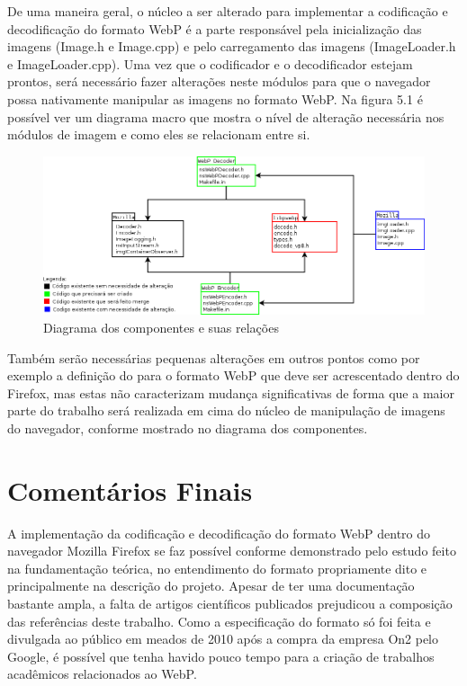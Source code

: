 \documentclass[espaco=simples,appendix=Name]{abnt}
\begin{document}
De uma maneira geral, o núcleo a ser alterado para implementar a codificação e decodificação do formato WebP é a parte responsável pela inicialização das imagens (Image.h e Image.cpp) e pelo carregamento das imagens (ImageLoader.h e ImageLoader.cpp). Uma vez que o codificador e o decodificador estejam prontos, será necessário fazer alterações neste módulos para que o navegador possa nativamente manipular as imagens no formato WebP. Na figura 5.1 é possível ver um diagrama macro que mostra o nível de alteração necessária nos módulos de imagem e como eles se relacionam entre si.

\begin{figure}[h]
  \centering
    \includegraphics[scale=0.45]{Arquitetura.png}
  \caption{Diagrama dos componentes e suas relações}
\end{figure}

Também serão necessárias pequenas alterações em outros pontos como por exemplo a definição do  para o formato WebP que deve ser acrescentado dentro do Firefox, mas estas não caracterizam mudança significativas de forma que a maior parte do trabalho será realizada em cima do núcleo de manipulação de imagens do navegador, conforme mostrado no diagrama dos componentes.

\chapter{Comentários Finais}

A implementação da codificação e decodificação do formato WebP dentro do navegador Mozilla Firefox se faz possível conforme demonstrado pelo estudo feito na fundamentação teórica, no entendimento do formato propriamente dito e principalmente na descrição do projeto. Apesar de ter uma documentação bastante ampla, a falta de artigos científicos publicados prejudicou a composição das referências deste trabalho. Como a especificação do formato só foi feita e divulgada ao público em meados de 2010 após a compra da empresa On2 pelo Google, é possível que tenha havido pouco tempo para a criação de trabalhos acadêmicos relacionados ao WebP.
\end{document}
